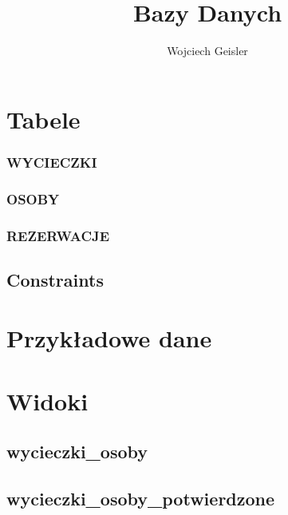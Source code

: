 \documentclass[12pt]{article}
\begin{document}
\title{Bazy Danych}
\author{Wojciech Geisler}
\date{}
\maketitle

\tableofcontents

\clearpage

\section{Tabele}

\subsubsection{WYCIECZKI}


\subsubsection{OSOBY}


\subsubsection{REZERWACJE}


\subsection{Constraints}


\section{Przykładowe dane}


\section{Widoki}


\subsection{wycieczki\_osoby}


\subsection{wycieczki\_osoby\_potwierdzone}

\end{document}
